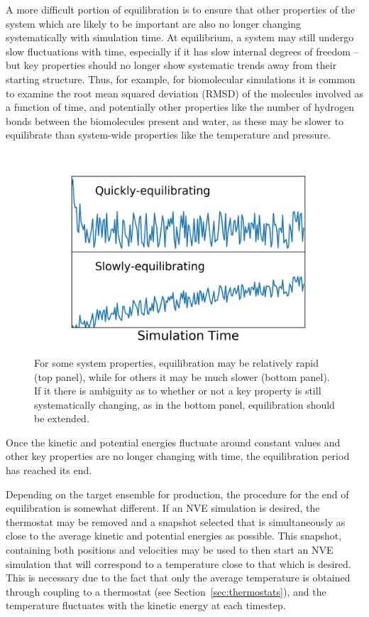 \documentclass[9pt,bestpractices]{livecoms}
\begin{document}
A more difficult portion of equilibration is to ensure that other properties of the system which are likely to be important are also no longer changing systematically with simulation time.
At equilibrium, a system may still undergo slow fluctuations with time, especially if it has slow internal degrees of freedom -- but key properties should no longer show systematic trends away from their starting structure.
Thus, for example, for biomolecular simulations it is common to examine the root mean squared deviation (RMSD) of the molecules involved as a function of time, and potentially other properties like the number of hydrogen bonds between the biomolecules present and water, as these may be slower to equilibrate than system-wide properties like the temperature and pressure.

\begin{figure}[h]
\centering
\includegraphics[width=\linewidth]{Equilibration_fig.png}
\caption{For some system properties, equilibration may be relatively rapid (top panel), while for others it may be much slower (bottom panel). If it there is ambiguity as to whether or not a key property is still systematically changing, as in the bottom panel, equilibration should be extended.}
\label{equilibration}
\end{figure}

Once the kinetic and potential energies fluctuate around constant values and other key properties are no longer changing with time, the equilibration period has reached its end.

Depending on the target ensemble for production, the procedure for the end of equilibration is somewhat different.
If an NVE simulation is desired, the thermostat may be removed and a snapshot selected that is simultaneously as close to the average kinetic and potential energies as possible.
This snapshot, containing both positions and velocities may be used to then start an NVE simulation that will correspond to a temperature close to that which is desired.
This is necessary due to the fact that only the average temperature is obtained through coupling to a thermostat (see Section~\ref{sec:thermostats}), and the temperature fluctuates with the kinetic energy at each timestep.
\end{document}
